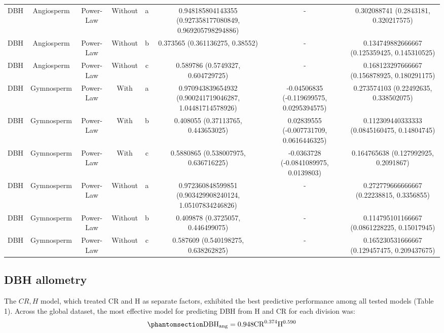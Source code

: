 \documentclass[
  12pt,
  letterpaper,
  DIV=11,
  numbers=noendperiod]{scrartcl}
\begin{document}
\begin{longtable*}[t]{cccccccc}
\addlinespace
DBH & Angiosperm & Power-Law & Without & a & 0.948185804143355 (0.927358177080849, 0.969205798294886) & - & 0.302088741 (0.2843181, 0.320217575)\\
DBH & Angiosperm & Power-Law & Without & b & 0.373565 (0.361136275, 0.38552) & - & 0.134749882666667 (0.125359425, 0.145310525)\\
DBH & Angiosperm & Power-Law & Without & c & 0.589786 (0.5749327, 0.604729725) & - & 0.168123297666667 (0.156878925, 0.180291175)\\
DBH & Gymnosperm & Power-Law & With & a & 0.970943839654932 (0.900241719046287, 1.04481714578926) & -0.04506835 (-0.119699575, 0.0295394575) & 0.273574103 (0.22492635, 0.338502075)\\
DBH & Gymnosperm & Power-Law & With & b & 0.408055 (0.37113765, 0.443653025) & 0.02839555 (-0.007731709, 0.0616446325) & 0.112309440333333 (0.0845160475, 0.14804745)\\
\addlinespace
DBH & Gymnosperm & Power-Law & With & c & 0.5880865 (0.538007975, 0.636716225) & -0.0363728 (-0.0841089975, 0.0139803) & 0.164765638 (0.127992925, 0.2091867)\\
DBH & Gymnosperm & Power-Law & Without & a & 0.972360848599851 (0.903429908240124, 1.05107834246826) & - & 0.272779666666667 (0.22238815, 0.3356855)\\
DBH & Gymnosperm & Power-Law & Without & b & 0.409878 (0.3725057, 0.446499075) & - & 0.114795101166667 (0.0861228225, 0.15017945)\\
DBH & Gymnosperm & Power-Law & Without & c & 0.587609 (0.540198275, 0.638262825) & - & 0.165230531666667 (0.129457475, 0.209437675)\\
\bottomrule
\end{longtable*}
\endgroup{}

\subsection{DBH allometry}\label{dbh-allometry}

The \(CR,H\) model, which treated CR and H as separate factors,
exhibited the best predictive performance among all tested models (Table
1). Across the global dataset, the most effective model for predicting
DBH from H and CR for each division was:
\begin{equation}\phantomsection\label{eq-dbh_ang}{
\mathrm{DBH_{ang}} = \mathrm{0.948}
\mathrm{CR}^{\text{0.374}}
\mathrm{H}^{\text{0.590}}
}\end{equation}
\end{document}

